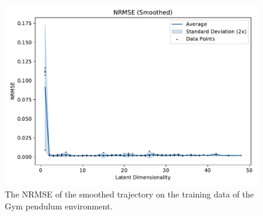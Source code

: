 			\begin{figure}
				\centering
				\includegraphics[width=0.7\linewidth]{figures/results/pendulum-gym/latent-dim/comparison-rmse-smoothed-normalized-mean-vs-latent-dim.pdf}
				\caption[Error of the smoothed trajectory on the training data of the Gym pendulum experiment]{The NRMSE of the smoothed trajectory on the training data of the Gym pendulum environment.}
				\label{fig:gymPendulumRmseSmoothed}
			\end{figure}

